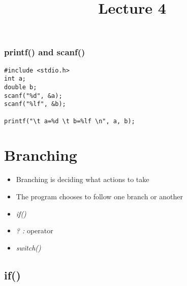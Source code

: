 \documentclass[10pt]{beamer}
\title{Lecture 4}
\date{}
\begin{document}
\frame{
    \titlepage
}

\begin{frame}[fragile]
  \frametitle{printf() and scanf()}

\begin{lstlisting}
#include <stdio.h>
int a;
double b;
scanf("%d", &a);
scanf("%lf", &b);

printf("\t a=%d \t b=%lf \n", a, b);

\end{lstlisting}

\end{frame}

\section{Branching}

\begin{frame}
  \begin{itemize}
    \item Branching is deciding what actions to take
    \item The program chooses to follow one branch or another
    \item \textit{if()}
    \item \textit{? :} operator
    \item \textit{switch() {}}
  \end{itemize}
\end{frame}

\subsection{if()}
\end{document}
